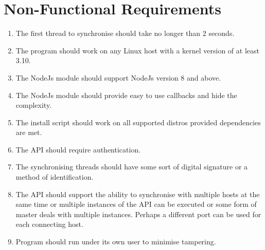 \section{Non-Functional Requirements}
\begin{enumerate}

	\item The first thread to synchronise should take no longer than 2 seconds.
	\item The program should work on any Linux host with a kernel version of at least 3.10.
	\item The NodeJs module should support NodeJs version 8 and above. 
	\item The NodeJs module should provide easy to use callbacks and hide the complexity.
	\item The install script should work on all supported distros provided dependencies are met. 
	\item The API should require authentication.
	\item The synchronising threads should have some sort of digital signature or a method of identification.
	\item The API should support the ability to synchronise with multiple hosts at the same time or multiple instances of the API can be executed or some form of master deals with multiple instances. Perhaps a different port can be used for each connecting host.
	\item Program should run under its own user to minimise tampering.
\end{enumerate}


